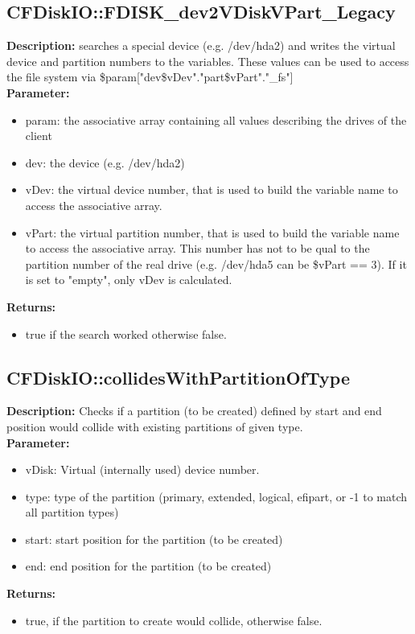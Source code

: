 \subsection{CFDiskIO::FDISK\_dev2VDiskVPart\_Legacy}
\textbf{Description:} searches a special device (e.g. /dev/hda2) and writes the virtual device and partition numbers to the variables. These values can be used to access the file system via \$param["dev\$vDev"."part\$vPart"."\_fs"]\\
\textbf{Parameter:}
\begin{itemize}
\item param: the associative array containing all values describing the drives of the client
\item dev: the device (e.g. /dev/hda2)
\item vDev: the virtual device number, that is used to build the variable name to access the associative array.
\item vPart: the virtual partition number, that is used to build the variable name to access the associative array. This number has not to be qual to the partition number of the real drive (e.g. /dev/hda5 can be \$vPart == 3). If it is set to "empty", only vDev is calculated.
\end{itemize}
\textbf{Returns:}
\begin{itemize}
\item true if the search worked otherwise false.
\end{itemize}

\subsection{CFDiskIO::collidesWithPartitionOfType}
\textbf{Description:} Checks if a partition (to be created) defined by start and end position would collide with existing partitions of given type.\\
\textbf{Parameter:}
\begin{itemize}
\item vDisk: Virtual (internally used) device number.
\item type: type of the partition (primary, extended, logical, efipart, or -1 to match all partition types)
\item start: start position for the partition (to be created)
\item end: end position for the  partition (to be created)
\end{itemize}
\textbf{Returns:}
\begin{itemize}
\item true, if the partition to create would collide, otherwise false.
\end{itemize}

